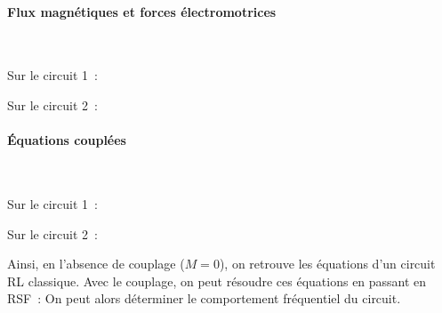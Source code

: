 \documentclass[../main/main.tex]{subfiles}
\begin{document}
\paragraph*{Flux magnétiques et forces électromotrices}~
\smallbreak
\noindent
\begin{minipage}[t]{.5\linewidth}
  \begin{center}
    Sur le circuit 1~:
  \end{center}
  \vspace*{-20pt}
\end{minipage}
\hfill
\begin{minipage}[t]{.5\linewidth}
  \begin{center}
    Sur le circuit 2~:
  \end{center}
  \vspace*{-20pt}
\end{minipage}

\paragraph*{Équations couplées}~
\smallbreak
\noindent
\begin{minipage}[t]{.5\linewidth}
  \begin{center}
    Sur le circuit 1~:
  \end{center}
  \vspace*{-10pt}
\end{minipage}
\hfill
\begin{minipage}[t]{.5\linewidth}
  \begin{center}
    Sur le circuit 2~:
  \end{center}
  \vspace*{-10pt}
\end{minipage}
Ainsi, en l'absence de couplage ($M = 0$), on retrouve les équations d'un
circuit RL classique. Avec le couplage, on peut résoudre ces équations en
passant en RSF~:
On peut alors déterminer le comportement fréquentiel du circuit.
\end{document}

